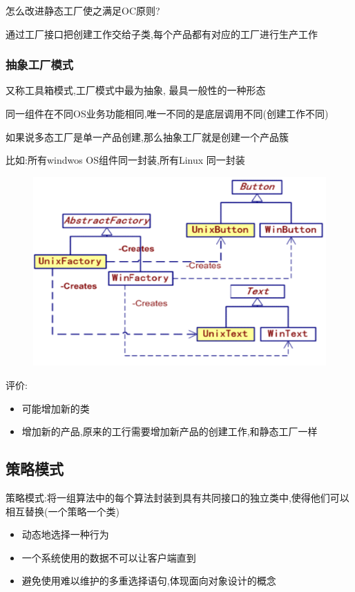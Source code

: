\documentclass[UTF8,a4paper]{ctexart}
\begin{document}
怎么改进静态工厂使之满足OC原则?

通过工厂接口把创建工作交给子类,每个产品都有对应的工厂进行生产工作

\subsubsection{抽象工厂模式}
又称工具箱模式,工厂模式中最为抽象, 最具一般性的一种形态

同一组件在不同OS业务功能相同,唯一不同的是底层调用不同(创建工作不同)

如果说多态工厂是单一产品创建,那么抽象工厂就是创建一个产品簇

比如:所有windwos OS组件同一封装,所有Linux 同一封装

\begin{figure}[H]
  \centering
  \includegraphics[scale = 0.3]{assets/SoftwareEngineering_e579a.png}
\end{figure}

评价:
\begin{itemize}
  \item 可能增加新的类
  \item 增加新的产品,原来的工行需要增加新产品的创建工作,和静态工厂一样
\end{itemize}

\subsection{策略模式}
策略模式:将一组算法中的每个算法封装到具有共同接口的独立类中,使得他们可以相互替换(一个策略一个类)

\begin{itemize}
  \item 动态地选择一种行为
  \item 一个系统使用的数据不可以让客户端直到
  \item 避免使用难以维护的多重选择语句,体现面向对象设计的概念
\end{itemize}
\end{document}
